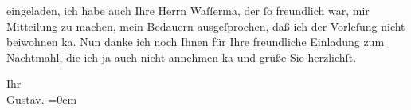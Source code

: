                eingeladen, ich habe auch Ihre Herrn Waſſerma{\geminationn}, der{ }ſo freundlich war, mir Mitteilung zu
               machen, mein Bedauern ausgeſprochen, daß ich der Vorleſung nicht beiwohnen ka{\geminationn}.
               Nun {\pb}danke ich noch Ihnen für Ihre
               freundliche Einladung zum Nachtmahl, die ich ja auch nicht annehmen ka{\geminationn} und grüße Sie herzlichſt.\pend
           
\pstart
           Ihr{\\[\baselineskip]}\spacefill\mbox{Gustav.}\pend
           \leftskip=0em{}\endnumbering{}
\begin{anhang}
\end{anhang}\newcommand{\dateiname}{L04286}\newcommand{\titel}{Gustav Schwarzkopf an Arthur Schnitzler, 6. 12. 1896}\newcommand{\editorInnen}{Herausgegeben von Jahnke, SelmaMüller, Martin Anton}
